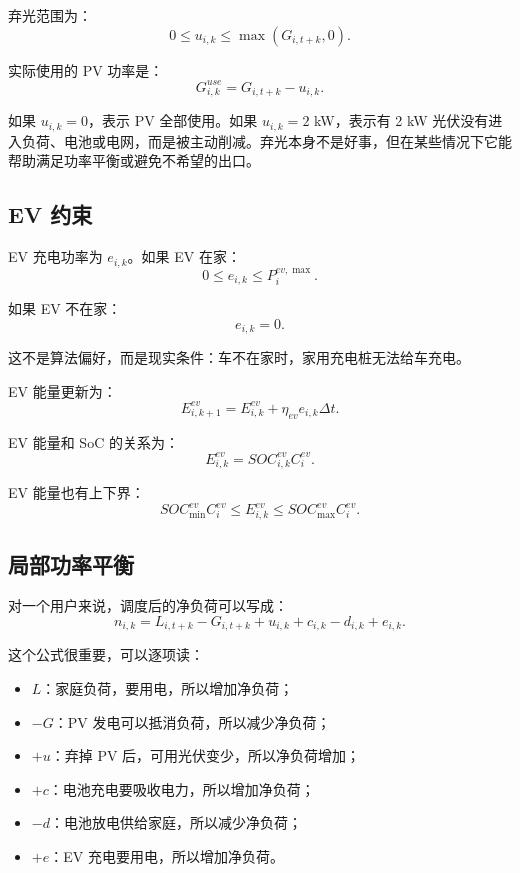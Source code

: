 \documentclass[UTF8,zihao=-4]{ctexart}
\begin{document}
弃光范围为：
\begin{equation}
0\le u_{i,k}\le \max(G_{i,t+k},0).
\end{equation}

实际使用的 PV 功率是：
\begin{equation}
G^{use}_{i,k}=G_{i,t+k}-u_{i,k}.
\end{equation}

如果 $u_{i,k}=0$，表示 PV 全部使用。如果 $u_{i,k}=2$ kW，表示有 2 kW 光伏没有进入负荷、电池或电网，而是被主动削减。弃光本身不是好事，但在某些情况下它能帮助满足功率平衡或避免不希望的出口。

\subsection{EV 约束}

EV 充电功率为 $e_{i,k}$。如果 EV 在家：
\begin{equation}
0\le e_{i,k}\le P^{ev,\max}_i.
\end{equation}

如果 EV 不在家：
\begin{equation}
e_{i,k}=0.
\end{equation}

这不是算法偏好，而是现实条件：车不在家时，家用充电桩无法给车充电。

EV 能量更新为：
\begin{equation}
E^{ev}_{i,k+1}
=
E^{ev}_{i,k}
+\eta_{ev}e_{i,k}\Delta t.
\end{equation}

EV 能量和 SoC 的关系为：
\begin{equation}
E^{ev}_{i,k}=SOC^{ev}_{i,k}C^{ev}_i.
\end{equation}

EV 能量也有上下界：
\begin{equation}
SOC^{ev}_{\min}C^{ev}_i
\le
E^{ev}_{i,k}
\le
SOC^{ev}_{\max}C^{ev}_i.
\end{equation}

\subsection{局部功率平衡}

对一个用户来说，调度后的净负荷可以写成：
\begin{equation}
n_{i,k}
=
L_{i,t+k}
-G_{i,t+k}
+u_{i,k}
+c_{i,k}
-d_{i,k}
+e_{i,k}.
\end{equation}

这个公式很重要，可以逐项读：
\begin{itemize}
  \item $L$：家庭负荷，要用电，所以增加净负荷；
  \item $-G$：PV 发电可以抵消负荷，所以减少净负荷；
  \item $+u$：弃掉 PV 后，可用光伏变少，所以净负荷增加；
  \item $+c$：电池充电要吸收电力，所以增加净负荷；
  \item $-d$：电池放电供给家庭，所以减少净负荷；
  \item $+e$：EV 充电要用电，所以增加净负荷。
\end{itemize}
\end{document}
